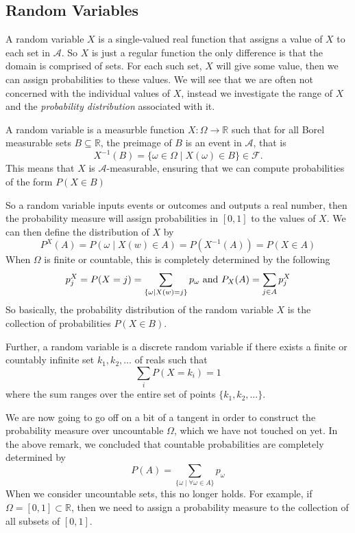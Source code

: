 \documentclass[../main.tex]{subfiles}
\begin{document}
\subsection{Random Variables}
\indent A random variable $X$ is a single-valued real function that assigns 
a value of $X$ to each set in $\mathcal{A}$. So $X$ is just a regular function
the only difference is that the domain is comprised of sets. For each such
set, $X$ will give some value, then we can assign probabilities to these values. We will
see that we are often not concerned with the individual values of $X$, instead
we investigate the range of $X$ and the \textit{probability distribution} associated with it.




\begin{definition} \label{def: Random_Variable}
A random variable is a measurble function $ X: \Omega \to \mathbb{R}$ such that for all Borel measurable sets $ B \subseteq \mathbb{R}$,
the preimage of $B$ is an event in $\mathcal{A}$, that is 
\[
X^{-1}(B) = \{ \omega \in \Omega \mid X(\omega) \in B \} \in \mathcal{F}.
\]
This means that $X$ is $\mathcal{A}$-measurable, ensuring that we can compute probabilities of the form $P(X \in B)$
\end{definition}


\begin{remark}
So a random variable inputs events or outcomes and outputs a real number, then the probability measure will assign probabilities in $[0,1]$ to the values of $X$.
We can then define the distribution of $X$ by
\[
P^X(A) = P({\omega \mid X(w) \in A}) = P(X^{-1}(A)) = P(X \in A)
\]
When $\Omega$ is finite or countable, this is completely determined by the following 
\[
p_j^X = P(X=j) = \sum_{\{\omega \mid X(w) =j\}}{p_\omega} \textnormal{ and } P_X(A) = \sum_{j \in A}{p^X_j}
\]
So basically, the probability distribution of the random variable $X$ is the collection
of probabilities $P(X\in B)$.
\par Further, a random variable is a discrete random variable if there exists
a finite or countably infinite set $k_1, k_2, \dots $ of reals such that
\[
\sum_i{P(X=k_i)} = 1
\]
where the sum ranges over the entire set of points $\{k_1, k_2, \dots\}$.
\end{remark}

\begin{remark}
We are now going to go off on a bit of a tangent in order to construct the probability 
measure over uncountable $\Omega$, which we have not touched on yet. In the
above remark, we concluded that countable probabilities are completely determined by \[
P(A) = \sum_{\{\omega \mid \forall \omega \in A\}}p_\omega
\]
When we consider uncountable sets, this no longer holds. For example, if $\Omega = [0,1] \subset \mathbb{R}$,
then we need to assign a probability measure to the collection of all subsets of $[0,1]$.
\end{remark}
\end{document}
